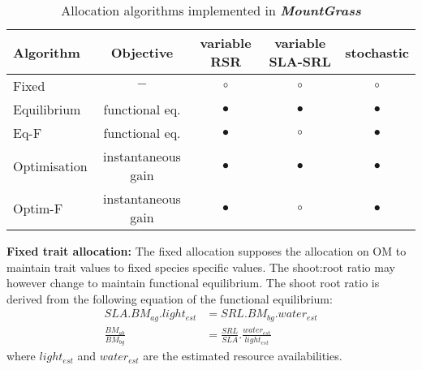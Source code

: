 \documentclass[a4paper,twoside, justified,marginals=raggedright, nobib]{tufte-handout}
\newcommand{\model}{\textit{\textbf{MountGrass }}}
\begin{document}
\begin{table*}
\caption{Allocation algorithms implemented in \model} 
\label{table:state_var_plant}
\begin{tabular}{l|c|c c c}
Algorithm & Objective & variable RSR & variable SLA-SRL & stochastic \\ 
\hline 
Fixed & $-$ & $\circ$ & $\circ$ & $\circ$ \\
Equilibrium & functional eq. & $\bullet$ & $\bullet$ & $\bullet$ \\
Eq-F & functional eq. & $\bullet$ & $\circ$ & $\bullet$ \\
Optimisation & instantaneous gain & $\bullet$ & $\bullet$ & $\bullet$ \\
Optim-F & instantaneous gain & $\bullet$ & $\circ$ & $\bullet$ \\
\end{tabular} 
\vspace*{0.5cm}
\end{table*}

\textbf{Fixed trait allocation:} The fixed allocation supposes the allocation on OM to maintain trait values to fixed species specific values. The shoot:root ratio may however change to maintain functional equilibrium. The shoot root ratio is derived from the following equation of the functional equilibrium:
\begin{align}\label{eq:equilibrium}
SLA . BM_{ag} . light_{est} &= SRL . BM_{bg} . water_{est}\\
\frac{BM_{ab}}{BM_{bg}} &= \frac{SRL}{SLA} . \frac{water_{est}}{light_{est}}
\end{align}
where $light_{est}$ and $water_{est}$ are the estimated resource availabilities.
%
\end{document}

